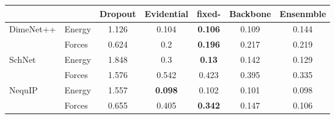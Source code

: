 \begin{tabular}{llccc|c|c}
\toprule
   {} & {} & Dropout & Evidential & fixed-\oursacro{} & Backbone & Ensenmble \\
   \midrule
\multirow{2}{*}{DimeNet++} & Energy & 1.126 & 0.104 & \textbf{0.106} & 0.109 & 0.144\\ & Forces & 0.624 & 0.2 & \textbf{0.196} & 0.217 & 0.219\\ %
\hline
\multirow{2}{*}{SchNet} & Energy & 1.848 & 0.3 & \textbf{0.13} & 0.142 & 0.129\\ & Forces & 1.576 & 0.542 & 0.423 & 0.395 & 0.335\\%
\hline
\multirow{2}{*}{NequIP} & Energy & 1.557 & \textbf{0.098} & 0.102 & 0.101 & 0.098\\ & Forces & 0.655 & 0.405 & \textbf{0.342} & 0.147 & 0.106\\%

\bottomrule
\end{tabular}